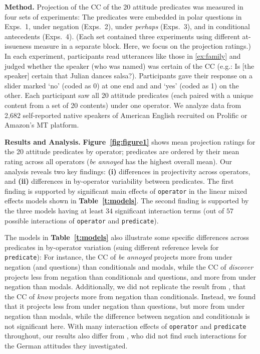 \documentclass[12pt, a4paper]{article}
\begin{document}
\noindent 
{\bf Method.}
	Projection of the CC of the 20 attitude predicates was measured in four sets of experiments: The predicates were embedded in polar questions in Exps.\ 1, under negation (Exps.\ 2), under {\em perhaps} (Exps.\ 3), and in conditional antecedents (Exps.\ 4). (Each set contained three experiments using different at-issueness measure in a separate block. Here, we focus on the projection ratings.)
	In each experiment, participants read utterances like those in \ref{ex:family} and judged whether the speaker (who was named) was certain of the CC (e.g.: Is [the speaker] certain that Julian dances salsa?). Participants gave their response on a slider marked `no' (coded as 0) at one end and and `yes' (coded as 1) on the other. Each participant saw all 20 attitude predicates (each paired with a unique content from a set of 20 contents) under one operator. We analyze data from 2,682 self-reported native speakers of American English recruited on Prolific or Amazon's MT platform.

\noindent
{\bf Results and Analysis.} 
	\textbf{Figure~\ref{fig:figure1}} shows mean projection ratings for the 20 attitude predicates by operator; predicates are ordered by their mean rating across all operators (\emph{be annoyed} has the highest overall mean).
	Our analysis reveals two key findings: \textbf{(i)} differences in projectivity across operators, and \textbf{(ii)} differences in by-operator variability between predicates.
	The first finding is supported by significant main effects of \texttt{operator} in the linear mixed effects models shown in \textbf{Table\ \ref{t:models}}.
	The second finding is supported by the three models having at least $34$ significant interaction terms (out of $57$ possible interactions of \texttt{operator} and \texttt{predicate}).

	The models in \textbf{Table\ \ref{t:models}} also illustrate some specific differences across predicates in by-operator variation (suing different reference levels for \texttt{predicate}): For instance, the CC of \emph{be annoyed} projects more from under negation (and questions) than conditionals and modals, while the CC of \emph{discover} projects less from negation than conditionals and questions, and more from under negation than modals.
	Additionally, we did not replicate the result from \citet{smith_relationship_2014,sieker_projective_2022}, that the CC of \emph{know} projects more from negation than conditionals. Instead, we found that it projects less from under negation than questions, but more from under negation than modals, while the difference between negation and conditionals is not significant here.
	With many interaction effects of \texttt{operator} and \texttt{predicate} throughout, our results also differ from \citet{sieker_projective_2022}, who did not find such interactions for the German attitudes they investigated.
\end{document}
